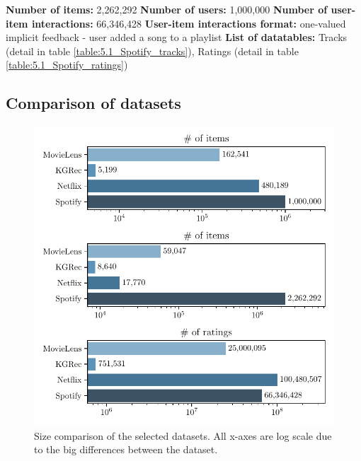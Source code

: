 \hfill \break
\noindent
\textbf{Number of items:} 2,262,292 \newline
\textbf{Number of users:} 1,000,000 \newline
\textbf{Number of user-item interactions:} 66,346,428 \newline
\textbf{User-item interactions format:} one-valued implicit feedback - user added a song to a playlist\newline
\textbf{List of datatables:} Tracks (detail in table \ref{table:5.1_Spotify_tracks}), Ratings (detail in table \ref{table:5.1_Spotify_ratings})




\subsection{Comparison of datasets}

\begin{figure}[ht!]
    \centering
    \includegraphics{img/figures/datasets_counts.pdf}
    \caption[Size comparison of the selected datasets.]{Size comparison of the selected datasets. All x-axes are log scale due to the big differences between the dataset.}
    \label{fig:datasets_counts}
\end{figure}

